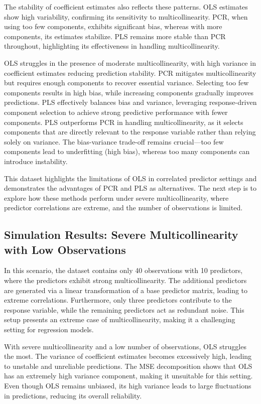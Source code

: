 \documentclass[11pt,twoside,a4paper]{article}
\begin{document}
The stability of coefficient estimates also reflects these patterns. OLS estimates show high variability, confirming its sensitivity to multicollinearity. PCR, when using too few components, exhibits significant bias, whereas with more components, its estimates stabilize. PLS remains more stable than PCR throughout, highlighting its effectiveness in handling multicollinearity.

OLS struggles in the presence of moderate multicollinearity, with high variance in coefficient estimates reducing prediction stability. PCR mitigates multicollinearity but requires enough components to recover essential variance. Selecting too few components results in high bias, while increasing components gradually improves predictions. PLS effectively balances bias and variance, leveraging response-driven component selection to achieve strong predictive performance with fewer components. PLS outperforms PCR in handling multicollinearity, as it selects components that are directly relevant to the response variable rather than relying solely on variance. The bias-variance trade-off remains crucial—too few components lead to underfitting (high bias), whereas too many components can introduce instability.

This dataset highlights the limitations of OLS in correlated predictor settings and demonstrates the advantages of PCR and PLS as alternatives. The next step is to explore how these methods perform under severe multicollinearity, where predictor correlations are extreme, and the number of observations is limited.

\subsection{Simulation Results: Severe Multicollinearity with Low Observations}  

In this scenario, the dataset contains only 40 observations with 10 predictors, where the predictors exhibit strong multicollinearity. The additional predictors are generated via a linear transformation of a base predictor matrix, leading to extreme correlations. Furthermore, only three predictors contribute to the response variable, while the remaining predictors act as redundant noise. This setup presents an extreme case of multicollinearity, making it a challenging setting for regression models.

With severe multicollinearity and a low number of observations, OLS struggles the most. The variance of coefficient estimates becomes excessively high, leading to unstable and unreliable predictions. The MSE decomposition shows that OLS has an extremely high variance component, making it unsuitable for this setting. Even though OLS remains unbiased, its high variance leads to large fluctuations in predictions, reducing its overall reliability.
\end{document}
